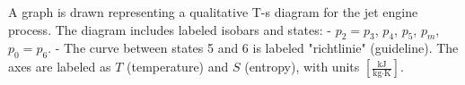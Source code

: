 A graph is drawn representing a qualitative T-s diagram for the jet engine process. The diagram includes labeled isobars and states:  
- \( p_2 = p_3 \), \( p_4 \), \( p_5 \), \( p_m \), \( p_0 = p_6 \).  
- The curve between states 5 and 6 is labeled "richtlinie" (guideline).  
The axes are labeled as \( T \) (temperature) and \( S \) (entropy), with units \( \left[\frac{\text{kJ}}{\text{kg·K}}\right] \).